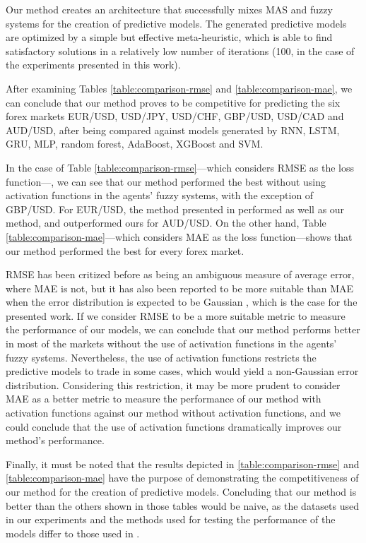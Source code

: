 \documentclass{ieeeaccess}
\begin{document}
Our method creates an architecture that successfully mixes MAS and
fuzzy systems for the creation of predictive models. The generated
predictive models are optimized by a simple but effective
meta-heuristic, which is able to find satisfactory solutions in a
relatively low number of iterations (100, in the case of the
experiments presented in this work).

After examining Tables \ref{table:comparison-rmse} and
\ref{table:comparison-mae}, we can conclude that our method proves to
be competitive for predicting the six forex markets EUR/USD, USD/JPY,
USD/CHF, GBP/USD, USD/CAD and AUD/USD, after being compared against
models generated by RNN, LSTM, GRU, MLP, random forest, AdaBoost,
XGBoost and SVM.

In the case of Table \ref{table:comparison-rmse}---which
considers RMSE as the loss function---, we can see that our method
performed the best without using activation functions in the agents'
fuzzy systems, with the exception of GBP/USD. For EUR/USD, the method
presented in \cite{Munkhdalai2019} performed as well as our method,
and outperformed ours for AUD/USD. On the other hand, Table
\ref{table:comparison-mae}---which considers MAE as the loss
function---shows that our method performed the best for every forex
market.

RMSE has been critized before \cite{willmott2005advantages}
\cite{willmott2009ambiguities} as being an ambiguous measure of
average error, where MAE is not, but it has also been reported to be
more suitable than MAE when the error distribution is expected to be
Gaussian \cite{chai2014root}, which is the case for the presented
work. If we consider RMSE to be a more suitable metric to measure the
performance of our models, we can conclude that our method performs
better in most of the markets without the use of activation functions
in the agents' fuzzy systems. Nevertheless, the use of activation
functions restricts the predictive models to trade in some cases,
which would yield a non-Gaussian error distribution. Considering this
restriction, it may be more prudent to consider MAE as a better metric
to measure the performance of our method with activation functions
against our method without activation functions, and we could conclude
that the use of activation functions dramatically improves our
method's performance.


Finally, it must be noted that the results depicted in
\ref{table:comparison-rmse} and \ref{table:comparison-mae} have the
purpose of demonstrating the competitiveness of our method for the
creation of predictive models. Concluding that our method is better
than the others shown in those tables would be naive, as the datasets
used in our experiments and the methods used for testing the
performance of the models differ to those used in
\cite{Munkhdalai2019}.
\end{document}

